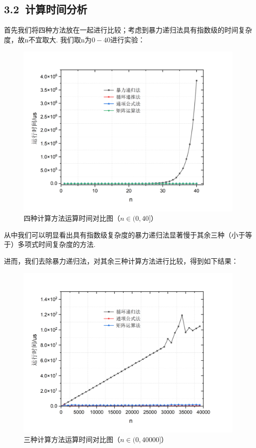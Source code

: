 \documentclass[UTF8]{ctexart}
\begin{document}
\subsection*{3.2\ 计算时间分析}
首先我们将四种方法放在一起进行比较；考虑到暴力递归法具有指数级的时间复杂度，故n不宜取大. 我们取n为$0-40$进行实验：
\begin{figure}[H]\begin{center}
\includegraphics[scale = 0.5]{graph1.png}
\caption{四种计算方法运算时间对比图（$n\in (0,40]$）}
\end{center}\end{figure}
从中我们可以明显看出具有指数级复杂度的暴力递归法显著慢于其余三种（小于等于）多项式时间复杂度的方法.\par
进而，我们去除暴力递归法，对其余三种计算方法进行比较，得到如下结果：
\begin{figure}[H]\begin{center}
	\includegraphics[scale = 0.5]{graph2.png}
	\caption{三种计算方法运算时间对比图（$n\in (0,40000]$）}
\end{center}\end{figure}
\end{document}
